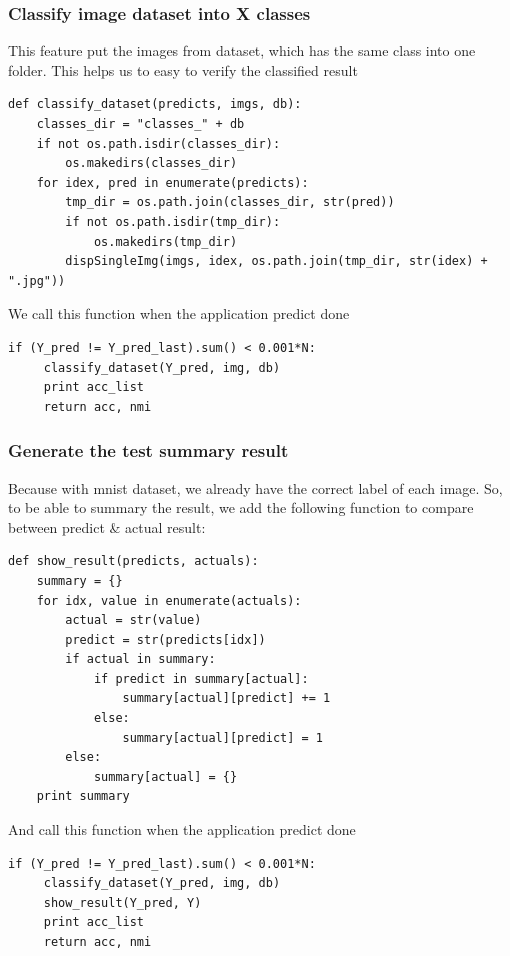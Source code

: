 \documentclass[11pt]{article}
\begin{document}
\subsubsection{Classify image dataset into X classes}
This feature put the images from dataset, which has the same class into one folder. This helps us to easy to verify the classified result

\begin{lstlisting}
def classify_dataset(predicts, imgs, db):
    classes_dir = "classes_" + db
    if not os.path.isdir(classes_dir):
        os.makedirs(classes_dir)
    for idex, pred in enumerate(predicts):
        tmp_dir = os.path.join(classes_dir, str(pred))
        if not os.path.isdir(tmp_dir):
            os.makedirs(tmp_dir)
        dispSingleImg(imgs, idex, os.path.join(tmp_dir, str(idex) + ".jpg"))
\end{lstlisting}
We call this function when the application predict done
\begin{lstlisting}
if (Y_pred != Y_pred_last).sum() < 0.001*N:
     classify_dataset(Y_pred, img, db)
     print acc_list
     return acc, nmi
\end{lstlisting}

\subsubsection{Generate the test summary result}

Because with mnist dataset, we already have the correct label of each image. So, to be able to summary the result, we add the following function to compare between predict \& actual result:

\begin{lstlisting}
def show_result(predicts, actuals):
    summary = {}
    for idx, value in enumerate(actuals):
        actual = str(value)
        predict = str(predicts[idx])
        if actual in summary:
            if predict in summary[actual]:
                summary[actual][predict] += 1
            else:
                summary[actual][predict] = 1
        else:
            summary[actual] = {}
    print summary
\end{lstlisting}
And call this function when the application predict done
\begin{lstlisting}
if (Y_pred != Y_pred_last).sum() < 0.001*N:
     classify_dataset(Y_pred, img, db)
     show_result(Y_pred, Y)
     print acc_list
     return acc, nmi
\end{lstlisting}
\end{document}

